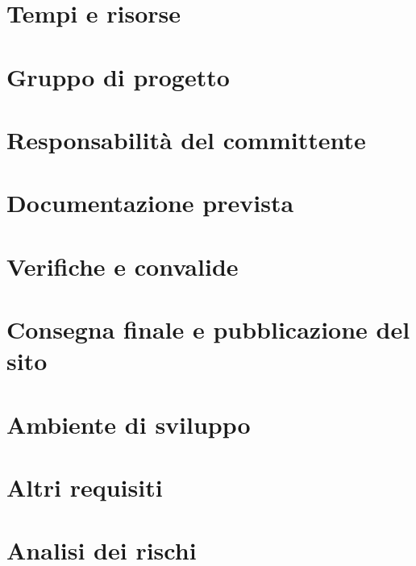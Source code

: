 \documentclass[a4paper,12pt,hidelinks]{report}
\begin{document}
\section{Tempi e risorse}
\section{Gruppo di progetto}
\section{Responsabilità del committente}
\section{Documentazione prevista}
\section{Verifiche e convalide}
\section{Consegna finale e pubblicazione del sito}
\section{Ambiente di sviluppo}
\section{Altri requisiti}
\section{Analisi dei rischi}
\end{document}
